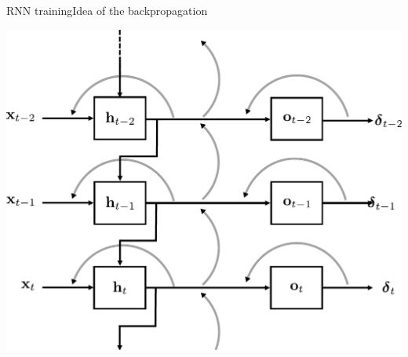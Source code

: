 \documentclass{beamer}
\begin{document}
\begin{frame}{RNN training}{Idea of the backpropagation}
\begin{center}
    \includegraphics[scale=0.45]{Module 5 (RNN)/pics/smaller_rnn_unrolled_BP.pdf}
    \end{center}
\end{frame}
\end{document}
